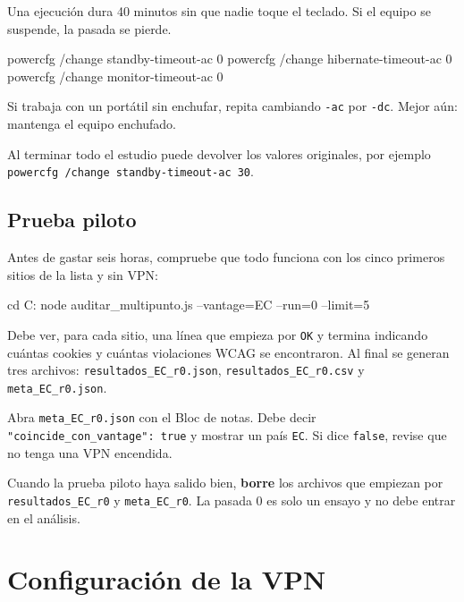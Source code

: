 \documentclass[11pt,a4paper]{article}
\begin{document}
Una ejecución dura 40 minutos sin que nadie toque el teclado. Si el equipo se suspende, la pasada se pierde.

\begin{orden}
powercfg /change standby-timeout-ac 0
powercfg /change hibernate-timeout-ac 0
powercfg /change monitor-timeout-ac 0
\end{orden}

Si trabaja con un portátil sin enchufar, repita cambiando \texttt{-ac} por \texttt{-dc}. Mejor aún: mantenga el equipo enchufado.

Al terminar todo el estudio puede devolver los valores originales, por ejemplo \texttt{powercfg /change standby-timeout-ac 30}.

\subsection{Prueba piloto}

Antes de gastar seis horas, compruebe que todo funciona con los cinco primeros sitios de la lista y sin VPN:

\begin{orden}
cd C:\auditoria
node auditar_multipunto.js --vantage=EC --run=0 --limit=5
\end{orden}

Debe ver, para cada sitio, una línea que empieza por \texttt{OK} y termina indicando cuántas cookies y cuántas violaciones WCAG se encontraron. Al final se generan tres archivos: \texttt{resultados\_EC\_r0.json}, \texttt{resultados\_EC\_r0.csv} y \texttt{meta\_EC\_r0.json}.

Abra \texttt{meta\_EC\_r0.json} con el Bloc de notas. Debe decir \texttt{"coincide\_con\_vantage": true} y mostrar un país \texttt{EC}. Si dice \texttt{false}, revise que no tenga una VPN encendida.

\begin{aviso}
	Cuando la prueba piloto haya salido bien, \textbf{borre} los archivos que empiezan por \texttt{resultados\_EC\_r0} y \texttt{meta\_EC\_r0}. La pasada 0 es solo un ensayo y no debe entrar en el análisis.
\end{aviso}

\section{Configuración de la VPN}\label{sec:vpn}
\end{document}
